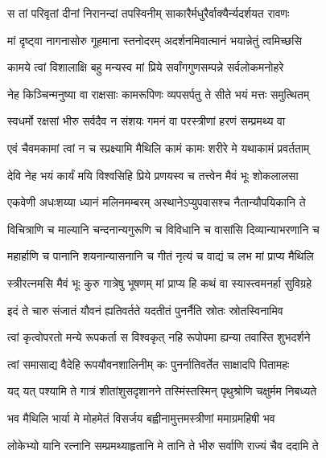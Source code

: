 
\twolineshloka
{स तां परिवृतां दीनां निरानन्दां तपस्विनीम्}
{साकारैर्मधुरैर्वाक्यैर्न्यदर्शयत रावणः} %

\twolineshloka
{मां दृष्ट्वा नागनासोरु गूहमाना स्तनोदरम्}
{अदर्शनमिवात्मानं भयान्नेतुं त्वमिच्छसि} %

\twolineshloka
{कामये त्वां विशालाक्षि बहु मन्यस्व मां प्रिये}
{सर्वांगगुणसम्पन्ने सर्वलोकमनोहरे} %

\twolineshloka
{नेह किञ्चिन्मनुष्या वा राक्षसाः कामरूपिणः}
{व्यपसर्पतु ते सीते भयं मत्तः समुत्थितम्} %

\twolineshloka
{स्वधर्मो रक्षसां भीरु सर्वदैव न संशयः}
{गमनं वा परस्त्रीणां हरणं सम्प्रमथ्य वा} %

\twolineshloka
{एवं चैवमकामां त्वां न च स्प्रक्ष्यामि मैथिलि}
{कामं कामः शरीरे मे यथाकामं प्रवर्तताम्} %

\twolineshloka
{देवि नेह भयं कार्यं मयि विश्वसिहि प्रिये}
{प्रणयस्व च तत्त्वेन मैवं भूः शोकलालसा} %

\twolineshloka
{एकवेणी अधःशय्या ध्यानं मलिनमम्बरम्}
{अस्थानेऽप्युपवासश्च नैतान्यौपयिकानि ते} %

\twolineshloka
{विचित्राणि च माल्यानि चन्दनान्यगुरूणि च}
{विविधानि च वासांसि दिव्यान्याभरणानि च} %

\twolineshloka
{महार्हाणि च पानानि शयनान्यासनानि च}
{गीतं नृत्यं च वाद्यं च लभ मां प्राप्य मैथिलि} %

\twolineshloka
{स्त्रीरत्नमसि मैवं भूः कुरु गात्रेषु भूषणम्}
{मां प्राप्य हि कथं वा स्यास्त्वमनर्हा सुविग्रहे} %

\twolineshloka
{इदं ते चारु संजातं यौवनं ह्यतिवर्तते}
{यदतीतं पुनर्नैति स्रोतः स्रोतस्विनामिव} %

\twolineshloka
{त्वां कृत्वोपरतो मन्ये रूपकर्ता स विश्वकृत्}
{नहि रूपोपमा ह्यन्या तवास्ति शुभदर्शने} %

\twolineshloka
{त्वां समासाद्य वैदेहि रूपयौवनशालिनीम्}
{कः पुनर्नातिवर्तेत साक्षादपि पितामहः} %

\twolineshloka
{यद् यत् पश्यामि ते गात्रं शीतांशुसदृशानने}
{तस्मिंस्तस्मिन् पृथुश्रोणि चक्षुर्मम निबध्यते} %

\twolineshloka
{भव मैथिलि भार्या मे मोहमेतं विसर्जय}
{बह्वीनामुत्तमस्त्रीणां ममाग्रमहिषी भव} %

\twolineshloka
{लोकेभ्यो यानि रत्नानि सम्प्रमथ्याहृतानि मे}
{तानि ते भीरु सर्वाणि राज्यं चैव ददामि ते} %

